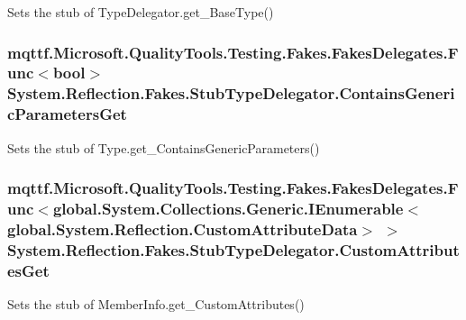 Sets the stub of Type\-Delegator.\-get\-\_\-\-Base\-Type()

\hypertarget{class_system_1_1_reflection_1_1_fakes_1_1_stub_type_delegator_a98d8fe5729f4bcf62868be21e32b409b}{
\subsubsection[{Contains\-Generic\-Parameters\-Get}]{\setlength{\rightskip}{0pt plus 5cm}mqttf.\-Microsoft.\-Quality\-Tools.\-Testing.\-Fakes.\-Fakes\-Delegates.\-Func$<$bool$>$ System.\-Reflection.\-Fakes.\-Stub\-Type\-Delegator.\-Contains\-Generic\-Parameters\-Get}}\label{class_system_1_1_reflection_1_1_fakes_1_1_stub_type_delegator_a98d8fe5729f4bcf62868be21e32b409b}


Sets the stub of Type.\-get\-\_\-\-Contains\-Generic\-Parameters()

\hypertarget{class_system_1_1_reflection_1_1_fakes_1_1_stub_type_delegator_a2564db468a8a46d4b58800bebce3f524}{
\subsubsection[{Custom\-Attributes\-Get}]{\setlength{\rightskip}{0pt plus 5cm}mqttf.\-Microsoft.\-Quality\-Tools.\-Testing.\-Fakes.\-Fakes\-Delegates.\-Func$<$global.\-System.\-Collections.\-Generic.\-I\-Enumerable$<$global.\-System.\-Reflection.\-Custom\-Attribute\-Data$>$ $>$ System.\-Reflection.\-Fakes.\-Stub\-Type\-Delegator.\-Custom\-Attributes\-Get}}\label{class_system_1_1_reflection_1_1_fakes_1_1_stub_type_delegator_a2564db468a8a46d4b58800bebce3f524}


Sets the stub of Member\-Info.\-get\-\_\-\-Custom\-Attributes()

